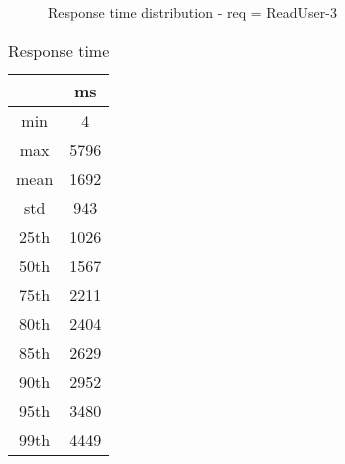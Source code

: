 \begin{minipage}{0.75\linewidth}
\begin{figure}[h]
\begin{adjustbox}{max width=1.0\linewidth, keepaspectratio}
  \end{adjustbox}
  \caption{Response time distribution - req = ReadUser-3}
\end{figure}
\end{minipage}\hfill\begin{minipage}{0.18\linewidth}
\begin{table}[h]
\begin{tabular}{|cc|}
\hline
\textbf{} & \textbf{ms}\\ \hline
 \Xhline{0.005\arrayrulewidth}
min & 4\\
 \Xhline{0.005\arrayrulewidth}
max & 5796\\
 \Xhline{0.005\arrayrulewidth}
mean & 1692\\
 \Xhline{0.005\arrayrulewidth}
std & 943\\
\hline
\hline
 \Xhline{0.005\arrayrulewidth}
25th & 1026\\
 \Xhline{0.005\arrayrulewidth}
50th & 1567\\
 \Xhline{0.005\arrayrulewidth}
75th & 2211\\
 \Xhline{0.005\arrayrulewidth}
80th & 2404\\
 \Xhline{0.005\arrayrulewidth}
85th & 2629\\
 \Xhline{0.005\arrayrulewidth}
90th & 2952\\
 \Xhline{0.005\arrayrulewidth}
95th & 3480\\
 \Xhline{0.005\arrayrulewidth}
99th & 4449\\
\hline
\end{tabular}
\caption{Response time}
\end{table}
\end{minipage}\hfill